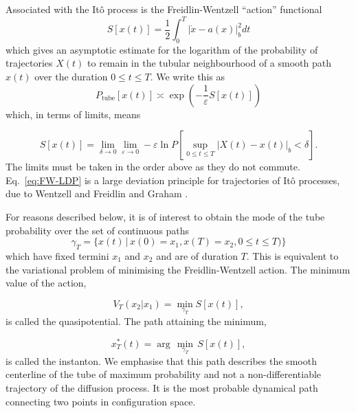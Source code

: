 Associated with the Itô process is the Freidlin-Wentzell ``action''
functional \citep{ventsel1970small,graham1973statistical,graham1987macroscopic}
\begin{equation}
S[x(t)]=\frac{1}{2}\int_{0}^{T}|\dot{x}-a(x)|_{b}^{2}dt\label{eq:Freidlin-Wentzell action}
\end{equation}
which gives an asymptotic estimate for the logarithm of the probability
of trajectories $X(t)$ to remain in the tubular neighbourhood of
a smooth path $x(t)$ over the duration $0\le t\leq T$. We write
this as
\begin{equation}
P_{\text{tube}}[x(t)]\asymp\exp\left(-\frac{1}{\varepsilon}S[x(t)]\right)\label{eq:FW-LDP}
\end{equation}
which, in terms of limits, means

\[
S[x(t)]=\lim_{\delta\to0}\lim_{\varepsilon\to0}-\varepsilon\ln P\left[\sup_{0\leq t\leq T}|X(t)-x(t)|_{b}<\delta\right].
\]
The limits must be taken in the order above as they do not commute.
Eq.~\ref{eq:FW-LDP} is a large deviation principle for trajectories
of Itô processes, due to Wentzell and Freidlin and Graham \citep{touchette2009large}.

For reasons described below, it is of interest to obtain the mode
of the tube probability over the set of continuous paths
\[
\gamma_{T}=\{x(t)\,|\,x(0)=x_{1},x(T)=x_{2},0\leq t\leq T)\}
\]
which have fixed termini $x_{1}$ and $x_{2}$ and are of duration
$T.$ This is equivalent to the variational problem of minimising
the Freidlin-Wentzell action. The minimum value of the action,

\begin{equation}
V_{T}(x_{2}|x_{1})=\min_{\gamma_{T}}S[x(t)],
\end{equation}
is called the quasipotential. The path attaining the minimum,

\begin{equation}
x_{T}^{*}(t)=\arg\,\min_{\gamma_{T}}\,S[x(t)],
\end{equation}
is called the instanton. We emphasise that this path describes the
smooth centerline of the tube of maximum probability and not a non-differentiable
trajectory of the diffusion process. It is the most probable dynamical
path connecting two points in configuration space. 

